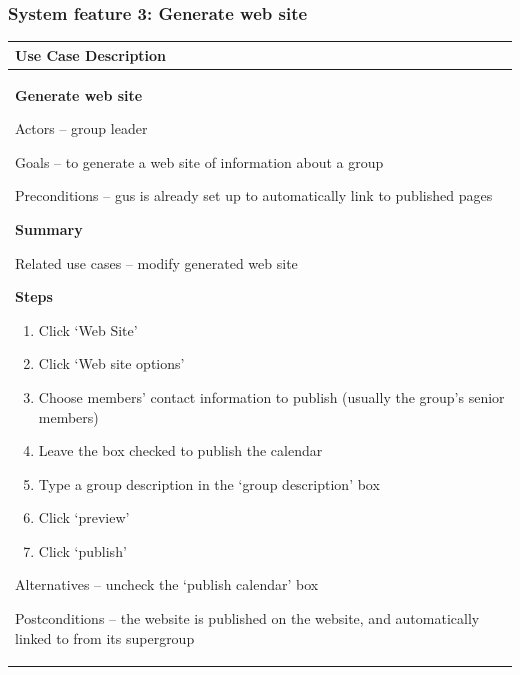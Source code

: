 \documentclass[letterpaper]{article}
\newcommand\liststyleLv{%
\renewcommand\theenumi{\arabic{enumi}}
\renewcommand\theenumii{\alph{enumii}}
\renewcommand\theenumiii{\roman{enumiii}}
\renewcommand\theenumiv{\arabic{enumiv}}
\renewcommand\labelenumi{\theenumi.}
\renewcommand\labelenumii{\theenumii.}
\renewcommand\labelenumiii{\theenumiii.}
\renewcommand\labelenumiv{\theenumiv.}
}
\begin{document}
\bigskip

\subsubsection[System feature 3: Generate web site]{\rmfamily System
feature 3: Generate web site}
\begin{flushleft}
\tablehead{}
\begin{supertabular}{|m{6.42126in}|}
\hline
\bfseries\color{black} Use Case Description\\\hline
{\bfseries\color{black} Generate web site}

{\color{black} Actors -- group leader}

{\color{black} Goals -- to generate a web site of information about a
group}

{\color{black} Preconditions -- gus is already set up to automatically
link to published pages}

{\bfseries\color{black} Summary}

{\color{black} Related use cases -- modify generated web site}

{\bfseries\color{black} Steps}

\liststyleLv
\begin{enumerate}
\item \color{black} Click {\textquoteleft}Web Site{\textquoteright}\item
\color{black} Click {\textquoteleft}Web site
options{\textquoteright}\item \color{black} Choose
members{\textquoteright} contact information to publish (usually the
group{\textquoteright}s senior members)\item \color{black} Leave the
box checked to publish the calendar\item \color{black} Type a group
description in the {\textquoteleft}group description{\textquoteright}
box\item \color{black} Click
{\textquoteleft}preview{\textquoteright}\item \color{black} Click
{\textquoteleft}publish{\textquoteright}\end{enumerate}
{\color{black} Alternatives -- uncheck the {\textquoteleft}publish
calendar{\textquoteright} box}

\color{black} Postconditions -- the website is published on the website,
and automatically linked to from its supergroup\\\hline
\end{supertabular}
\end{flushleft}
\end{document}
